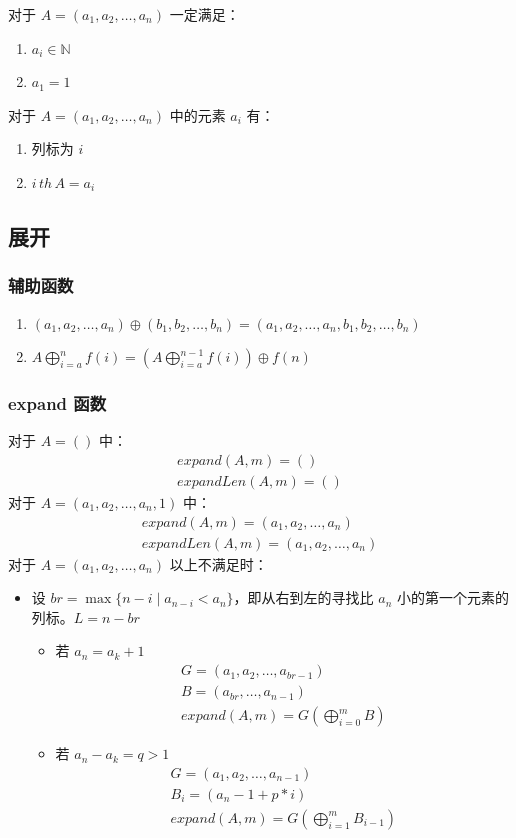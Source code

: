 \documentclass[UTF8]{ctexart}
\begin{document}
对于 $A=(a_1,a_2,\dots,a_n)$ 一定满足：
\begin{enumerate}
  \item $a_i\in\mathbb{N}$
  \item $a_1=1$
\end{enumerate}
对于 $A=(a_1,a_2,\dots,a_n)$ 中的元素 $a_i$ 有：
\begin{enumerate}
  \item 列标为 $i$
  \item $i\,th\,A=a_i$
\end{enumerate}

\subsection{展开}
\subsubsection{辅助函数}
\begin{enumerate}
  \item $(a_1,a_2,\dots,a_n)\oplus(b_1,b_2,\dots,b_n)=(a_1,a_2,\dots,a_n,b_1,b_2,\dots,b_n)$
  \item $A\bigoplus^n_{i=a}f(i)=(A\bigoplus^{n-1}_{i=a}f(i))\oplus f(n)$
\end{enumerate}

\subsubsection{expand 函数}
对于 $A=()$ 中：
\begin{gather*}
expand(A,m)=()\\
expandLen(A,m)=()
\end{gather*}
对于 $A=(a_1,a_2,\dots,a_n,1)$ 中：
\begin{gather*}
expand(A,m)=(a_1,a_2,\dots,a_n)\\
expandLen(A,m)=(a_1,a_2,\dots,a_n)
\end{gather*}
对于 $A=(a_1,a_2,\dots,a_n)$ 以上不满足时：
\begin{itemize}
  \item 设 $br=\max\{n-i\mid a_{n-i}<a_n\}$，即从右到左的寻找比 $a_n$ 小的第一个元素的列标。$L=n-br$
  \begin{itemize}
    \item 若 $a_n=a_k+1$
    \begin{gather*}
    G=(a_1,a_2,\dots,a_{br-1})\\
    B=(a_{br},\dots,a_{n-1})\\
    expand(A,m)=G(\bigoplus^m_{i=0}B)
    \end{gather*}
    \item 若 $a_n-a_k=q>1$
    \begin{gather*}
    G=(a_1,a_2,\dots,a_{n-1})\\
    B_i=(a_n-1+p*i)\\
    expand(A,m)=G(\bigoplus^m_{i=1}B_{i-1})
    \end{gather*}
  \end{itemize}
\end{itemize}
\end{document}

